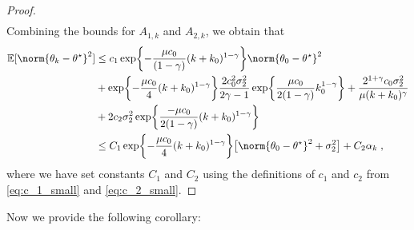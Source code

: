 \begin{proof}
\begin{align}
\end{align}
Combining the bounds for $A_{1,k}$ and $A_{2,k}$, we obtain that 
\begin{align}
\PE[\norm{\theta_k-\thetas}^2] 
&\leq c_{1} \exp\biggl\{-\frac{\mu c_0}{(1-\gamma)} (k+k_0)^{1-\gamma}\biggr\} \norm{\theta_0 - \thetas}^2 \\
&+ \exp\biggl\{-\frac{\mu c_0}{4} (k+k_0)^{1-\gamma}\biggr\} \frac{2c_0^2 \sigma_2^2}{2\gamma-1}\exp\biggl\{\frac{\mu c_0}{2(1-\gamma)}k_0^{1-\gamma}\biggr\}+  \frac{2^{1+\gamma} c_0 \sigma_2^2}{\mu (k+k_0)^{\gamma}} \\
&+ 2 c_2 \sigma_2^2 \exp\biggl\{\frac{-\mu c_0}{2(1-\gamma)}(k+k_0)^{1-\gamma}\biggr\} \\
&\leq C_{1} \exp\biggl\{-\frac{\mu c_0}{4} (k+k_0)^{1-\gamma}\biggr\} \bigl[ \norm{\theta_0-\thetas}^2 + \sigma_2^2\bigr] + C_{2} \alpha_{k}  \eqsp,
\end{align}
where we have set constants $C_1$ and $C_2$ using the definitions of $c_1$ and $c_2$ from \eqref{eq:c_1_small} and \eqref{eq:c_2_small}. 
\end{proof}


Now we provide the following corollary:

